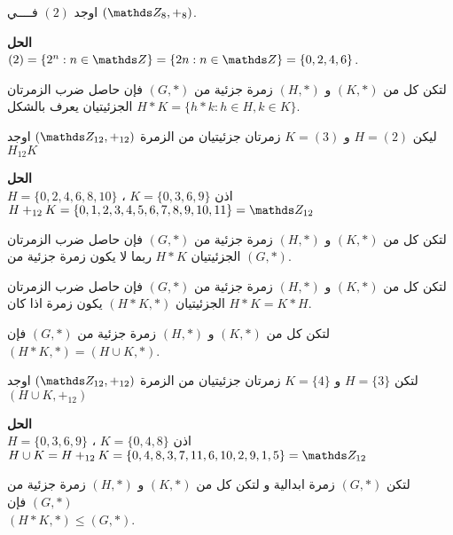    \begin{example}
   	اوجد $(2)$ فــــي $(\Z_8, +_8)$.
   \end{example}
   \noindent
   \textbf{الحل}\\
   \noindent
   $(2) = \{2^n : n\in \Z\} = \{2n : n\in \Z\} = \{0,2,4,6\}$.
   
\begin{definition}
	لتكن كل من $(K, *)$ و $(H, *)$ زمرة جزئية من $(G, *)$ فإن حاصل ضرب الزمرتان الجزئيتيان يعرف بالشكل
	$
	H * K = \{h * k : h \in H, k \in K\}
	$.
\end{definition}

\begin{example}
	ليكن $H=(2)$ و $K=(3)$ زمرتان جزئيتيان من الزمرة $(\Z_{12}, +_{12})$ اوجد $H_{12}K$
\end{example}
\noindent
\textbf{الحل}\\
\noindent
$H=\{0,2,4,6,8,10\}$ ، $K=\{0,3,6,9\}$ اذن\\
 $H+_{12} K=\{0,1,2,3,4,5,6,7,8,9,10,11\} = \Z_{12}$
 
 \begin{note}
 		لتكن كل من $(K, *)$ و $(H, *)$ زمرة جزئية من $(G, *)$ فإن حاصل ضرب الزمرتان الجزئيتيان $H*K$ ربما لا يكون زمرة جزئية من $(G,*)$.
 \end{note}
 
 \begin{theorem}
 		لتكن كل من $(K, *)$ و $(H, *)$ زمرة جزئية من $(G, *)$ فإن حاصل ضرب الزمرتان الجزئيتيان $(H*K, *)$ يكون زمرة اذا كان $H*K=K*H$.
 \end{theorem}
 
 \begin{note}
 		لتكن كل من $(K, *)$ و $(H, *)$ زمرة جزئية من $(G, *)$ فإن $(H*K, *) = (H\cup K, *)$.
 \end{note}
 
 \begin{example}
 	لتكن $H=\{3\}$  و $K=\{4\}$ زمرتان جزئيتيان من الزمرة $(\Z_{12}, +_{12})$ اوجد 
 	$(H\cup K, +_{12})$
 \end{example}
 \noindent
 \textbf{الحل}\\
 \noindent
 $H = \{0,3,6,9\}$ ، $K=\{0,4,8\} $ اذن \\
 $H \cup K = H+_{12} K = \{0,4,8,3,7,11,6,10,2,9,1,5\} = \Z_{12}$

 \begin{theorem}
 	لتكن $(G, *)$ زمرة ابدالية و	لتكن كل من $(K, *)$ و $(H, *)$ زمرة جزئية من $(G, *)$ فإن\\
 	 $(H*K, *) \leq (G, *)$.
 \end{theorem}
 

